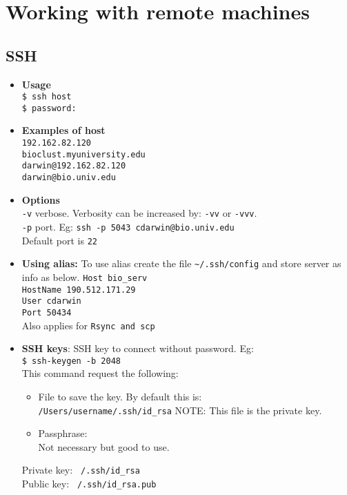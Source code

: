 \section{Working with remote machines}

\subsection{SSH}
\begin{itemize}
\item \textbf{Usage}\\
\texttt{\$ ssh host}\\
\texttt{\$ password:}\\

\item \textbf{Examples of host}\\
\texttt{192.162.82.120}\\
\texttt{bioclust.myuniversity.edu}\\
\texttt{darwin@192.162.82.120}\\
\texttt{darwin@bio.univ.edu}\\

\item \textbf{Options} \\

\texttt{-v} verbose. Verbosity can be increased by: \texttt{-vv} or \texttt{-vvv}. \\
\texttt{-p} port. Eg: \texttt{ssh -p 5043 cdarwin@bio.univ.edu}\\
\qquad Default port is \texttt{22}

 
\item \textbf{Using alias:} To use alias create the file \texttt{\~{}/.ssh/config} and store server as info as below. 
\texttt{Host bio\_serv}\\
\qquad \texttt{HostName 190.512.171.29}\\
\qquad \texttt{User cdarwin}\\
\qquad \texttt{Port 50434}\\
Also applies for \texttt{Rsync and scp}\\

\item \textbf{SSH keys}: SSH key to connect without password. Eg:\\
\texttt{\$ ssh-keygen -b 2048}\\
This command request the following:\\
\begin{itemize}
\item File to save the key. By default this is:\\
\texttt{/Users/username/.ssh/id\_rsa}
NOTE: This file is the private key.\\
\item Passphrase:\\
Not necessary but good to use.\\
\end{itemize}
Private key: \texttt{~/.ssh/id\_rsa}\\
Public key: \texttt{~/.ssh/id\_rsa.pub}\\


\end{itemize}
